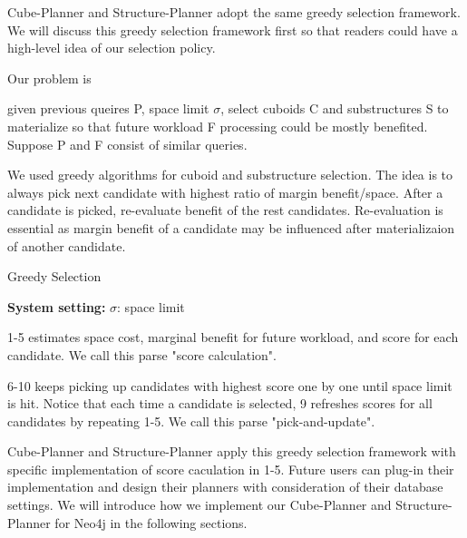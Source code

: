 Cube-Planner and Structure-Planner adopt the same greedy selection framework. We will discuss this greedy selection framework first so that readers could have a high-level idea of our selection policy.

 Our problem is  

given previous queires P, space limit $\sigma$, select cuboids C and substructures S to materialize so that future workload F processing could be mostly benefited. Suppose P and F consist of similar queries.
 
We used greedy algorithms for cuboid and substructure selection. The idea is to always pick next candidate with highest ratio of margin benefit/space. After a candidate is picked, re-evaluate benefit of the rest candidates. Re-evaluation is essential as margin benefit of a candidate may be influenced after materializaion of another candidate.


\begin{algorithm}[H]
	\caption{Greedy Selection}
	\LinesNumbered  
	\textbf{System setting:} $\sigma$: space limit\\ 
	
\end{algorithm}

1-5 estimates space cost, marginal benefit for future workload, and score for each candidate. We call this parse  "score calculation".

6-10 keeps picking up candidates with highest score one by one until space limit is hit. Notice that each time a candidate is selected, 9 refreshes scores for all candidates by repeating 1-5. We call this parse "pick-and-update".   

Cube-Planner and Structure-Planner apply this greedy selection framework with specific implementation of score caculation in 1-5. Future users can plug-in their implementation and design their planners with consideration of their database settings. We will introduce how we implement our Cube-Planner and Structure-Planner for Neo4j in the following sections.
 
